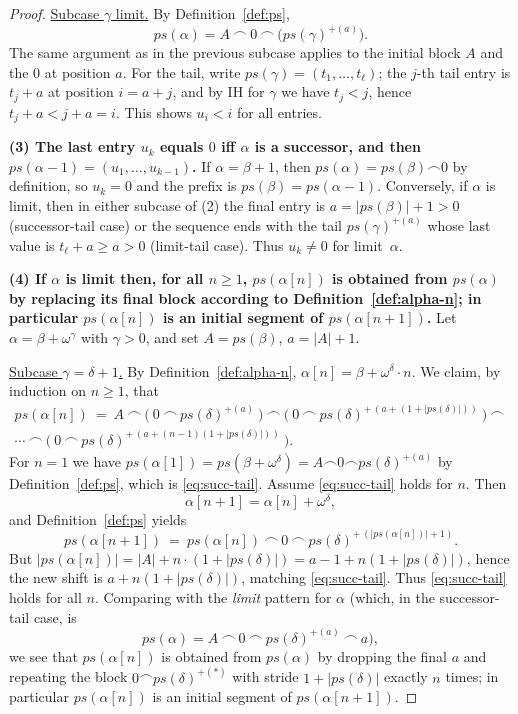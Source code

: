 \documentclass{article}
\theoremstyle{definition}
\theoremstyle{remark}
\begin{document}
\begin{proof}
\underline{Subcase \(\gamma\) limit.}
By Definition~\ref{def:ps},
\[
ps(\alpha)=A\ \frown\ 0\ \frown\ \bigl(ps(\gamma)^{+(a)}\bigr).
\]
The same argument as in the previous subcase applies to the initial block $A$ and the $0$ at position $a$. 
For the tail, write $ps(\gamma)=(t_1,\dots,t_\ell)$; the $j$-th tail entry is $t_j+a$ at position $i=a+j$, and by IH for $\gamma$ we have $t_j<j$, hence $t_j+a<j+a=i$. 
This shows $u_i<i$ for all entries.

\smallskip
\noindent\textbf{(3) The last entry $u_k$ equals $0$ iff $\alpha$ is a successor, and then $ps(\alpha-1)=(u_1,\dots,u_{k-1})$.}
If $\alpha=\beta+1$, then $ps(\alpha)=ps(\beta)\frown 0$ by definition, so $u_k=0$ and the prefix is $ps(\beta)=ps(\alpha-1)$. 
Conversely, if $\alpha$ is limit, then in either subcase of (2) the final entry is $a=|ps(\beta)|+1>0$ (successor-tail case) or the sequence ends with the tail $ps(\gamma)^{+(a)}$ whose last value is $t_\ell+a\ge a>0$ (limit-tail case). 
Thus $u_k\neq 0$ for limit~$\alpha$.

\smallskip
\noindent\textbf{(4) If $\alpha$ is limit then, for all $n\ge 1$, $ps(\alpha[n])$ is obtained from $ps(\alpha)$ by replacing its final block according to Definition~\ref{def:alpha-n}; in particular $ps(\alpha[n])$ is an initial segment of $ps(\alpha[n+1])$.}
Let $\alpha=\beta+\omega^\gamma$ with $\gamma>0$, and set $A=ps(\beta)$, $a=|A|+1$.

\underline{Subcase \(\gamma=\delta+1\).} 
By Definition~\ref{def:alpha-n}, $\alpha[n]=\beta+\omega^\delta\cdot n$. 
We claim, by induction on $n\ge 1$, that
\begin{multline}\label{eq:succ-tail}
ps(\alpha[n])\ =\ A\ \frown\ \bigl(\ 0\ \frown\ ps(\delta)^{+(a)}\ \bigr)\ \frown\ \bigl(\ 0\ \frown\ ps(\delta)^{+\,(a+(1+|ps(\delta)|))}\ \bigr)\ \frown\ \\ \cdots\ \frown\  \bigl(\ 0\ \frown\ ps(\delta)^{+\,(a+(n-1)(1+|ps(\delta)|))}\ \bigr).
\end{multline}
For $n=1$ we have $ps(\alpha[1])=ps(\beta+\omega^\delta)=A\frown 0 \frown ps(\delta)^{+(a)}$ by Definition~\ref{def:ps}, which is \eqref{eq:succ-tail}. 
Assume \eqref{eq:succ-tail} holds for $n$. Then
\[
\alpha[n+1]=\alpha[n]+\omega^\delta,
\]
and Definition~\ref{def:ps} yields
\[
ps(\alpha[n+1])\ =\ ps(\alpha[n])\ \frown\ 0\ \frown\ ps(\delta)^{+\,(|ps(\alpha[n])|+1)}.
\]
But $|ps(\alpha[n])|=|A|+n\cdot(1+|ps(\delta)|)=a-1+n(1+|ps(\delta)|)$, hence the new shift is $a+n(1+|ps(\delta)|)$, matching \eqref{eq:succ-tail}. 
Thus \eqref{eq:succ-tail} holds for all $n$. 
Comparing with the \emph{limit} pattern for $\alpha$ (which, in the successor-tail case, is 
\[
ps(\alpha)=A\ \frown\ 0\ \frown\ ps(\delta)^{+(a)}\ \frown\ a),
\]
we see that $ps(\alpha[n])$ is obtained from $ps(\alpha)$ by dropping the final $a$ and repeating the block $0\frown ps(\delta)^{+(*)}$ with stride $1+|ps(\delta)|$ exactly $n$ times; in particular $ps(\alpha[n])$ is an initial segment of $ps(\alpha[n+1])$.


\end{proof}
\end{document}
